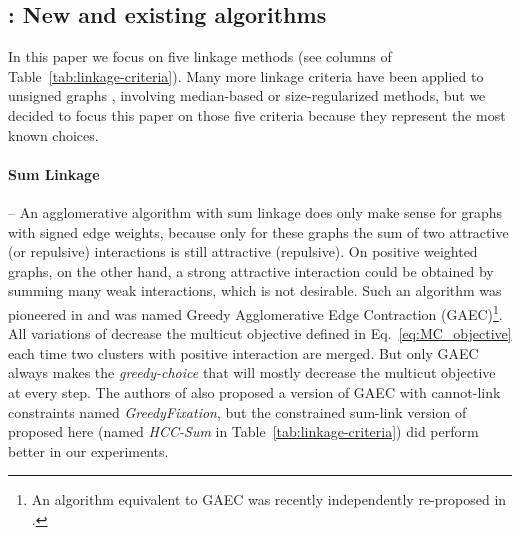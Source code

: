 \begin{algorithm}[t]
\end{algorithm}


\subsection{\algname{}: New and existing algorithms} \label{sec:alg_update_rules}


In this paper we focus on five linkage methods (see columns of Table~\ref{tab:linkage-criteria}). Many more linkage criteria have been applied to unsigned graphs \cite{nunez2013machine,felzenszwalb2004efficient,funke2018large}, involving median-based or size-regularized methods, but we decided to focus this paper on those five criteria because they represent the most known choices.  

\paragraph{Sum Linkage} -- 
An agglomerative algorithm with sum linkage does only make sense for graphs with signed edge weights, because only for these graphs the sum of two attractive (or repulsive) interactions is still attractive (repulsive). On positive weighted graphs, on the other hand, a strong attractive interaction could be obtained by summing many weak interactions, which is not desirable. Such an algorithm was pioneered in \cite{levinkov2017comparative,keuper2015efficient} and was named Greedy Agglomerative Edge Contraction (GAEC)\footnote{An algorithm equivalent to GAEC was recently independently re-proposed in \cite{chehreghani2020hierarchical}.}. All variations of \algname{} decrease the multicut objective defined in Eq.~\ref{eq:MC_objective} each time two clusters with positive interaction are merged. But only GAEC always makes the \emph{greedy-choice} that will mostly decrease the multicut objective at every step. The authors of \cite{levinkov2017comparative} also proposed a version of GAEC with cannot-link constraints named \emph{GreedyFixation}, but the constrained sum-link version of \algname{} proposed here (named \emph{HCC-Sum} in Table~\ref{tab:linkage-criteria}) did perform better in our experiments.

